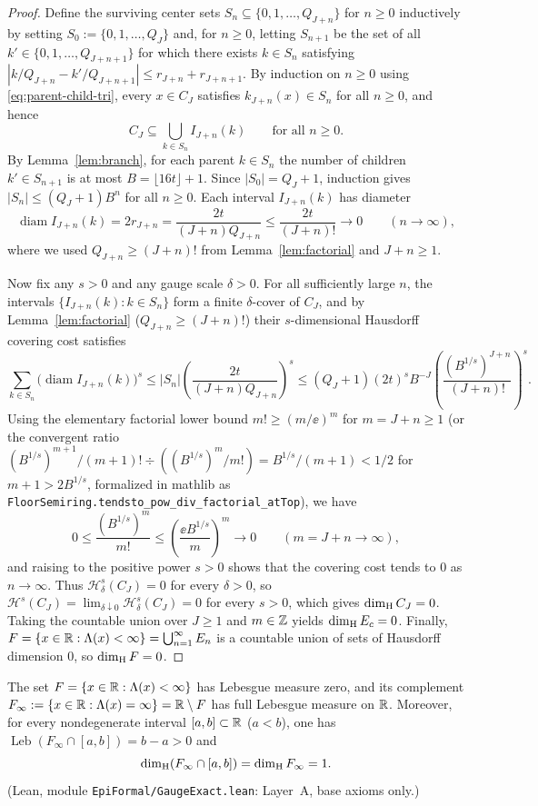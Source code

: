 \begin{proof}
Define the surviving center sets $S_n\subseteq\{0,1,\dots,Q_{J+n}\}$ for
$n\ge0$ inductively by setting $S_0:=\{0,1,\dots,Q_J\}$ and, for $n\ge0$,
letting $S_{n+1}$ be the set of all $k'\in\{0,1,\dots,Q_{J+n+1}\}$ for which
there exists $k\in S_n$ satisfying
$|k/Q_{J+n}-k'/Q_{J+n+1}|\le r_{J+n}+r_{J+n+1}$. By induction on $n\ge0$ using
\eqref{eq:parent-child-tri}, every $x\in C_J$ satisfies $k_{J+n}(x)\in S_n$ for
all $n\ge0$, and hence
\[
C_J\subseteq\bigcup_{k\in S_n} I_{J+n}(k)\qquad\text{for all }n\ge0.
\]
By Lemma~\ref{lem:branch}, for each parent $k\in S_n$ the number of children
$k'\in S_{n+1}$ is at most $B=\lfloor16t\rfloor+1$. Since $|S_0|=Q_J+1$,
induction gives $|S_n|\le(Q_J+1)B^n$ for all $n\ge0$. Each interval
$I_{J+n}(k)$ has diameter
\[
\operatorname{diam}I_{J+n}(k)=2r_{J+n}=\frac{2t}{(J+n)Q_{J+n}}
\le\frac{2t}{(J+n)!}\longrightarrow0\qquad(n\to\infty),
\]
where we used $Q_{J+n}\ge(J+n)!$ from Lemma~\ref{lem:factorial} and $J+n\ge1$.

Now fix any $s>0$ and any gauge scale $\delta>0$. For all sufficiently large
$n$, the intervals $\{I_{J+n}(k):k\in S_n\}$ form a finite $\delta$-cover of
$C_J$, and by Lemma~\ref{lem:factorial} ($Q_{J+n}\ge(J+n)!$) their $s$-dimensional
Hausdorff covering cost satisfies
\[
\sum_{k\in S_n}\bigl(\operatorname{diam}I_{J+n}(k)\bigr)^s
\le |S_n|\left(\frac{2t}{(J+n)Q_{J+n}}\right)^s
\le(Q_J+1)(2t)^s B^{-J}\left(\frac{(B^{1/s})^{J+n}}{(J+n)!}\right)^s.
\]
Using the elementary factorial lower bound $m!\ge(m/\ee)^m$ for $m=J+n\ge1$
(or the convergent ratio $(B^{1/s})^{m+1}/(m+1)!\div((B^{1/s})^m/m!)=B^{1/s}/(m+1)<1/2$
for $m+1>2B^{1/s}$, formalized in mathlib as
\texttt{FloorSemiring.tendsto\_pow\_div\_factorial\_atTop}), we have
\[
0\le\frac{(B^{1/s})^m}{m!}\le\left(\frac{\ee B^{1/s}}{m}\right)^m\longrightarrow0
\qquad(m=J+n\to\infty),
\]
and raising to the positive power $s>0$ shows that the covering cost tends to
$0$ as $n\to\infty$. Thus $\mathcal H_\delta^s(C_J)=0$ for every $\delta>0$,
so $\mathcal H^s(C_J)=\lim_{\delta\downarrow0}\mathcal H_\delta^s(C_J)=0$ for
every $s>0$, which gives $\dim_{\mathrm{H}} C_J=0$. Taking the countable union over
$J\ge1$ and $m\in\mathbb{Z}$ yields $\dim_{\mathrm{H}} E_c=0$. Finally,
$F=\{x\in\mathbb{R}:\Lambda(x)<\infty\}=\bigcup_{n=1}^\infty E_n$ is a countable union of
sets of Hausdorff dimension $0$, so $\dim_{\mathrm{H}} F=0$.
\end{proof}

\begin{corollary}\label{cor:infinite-level}
The set $F=\{x\in\mathbb{R}:\Lambda(x)<\infty\}$ has Lebesgue measure zero, and its
complement $F_\infty:=\{x\in\mathbb{R}:\Lambda(x)=\infty\}=\mathbb{R}\setminus F$ has full
Lebesgue measure on $\mathbb{R}$. Moreover, for every nondegenerate interval
$[a,b]\subset\mathbb{R}$ ($a<b$), one has
$\operatorname{Leb}(F_\infty\cap[a,b])=b-a>0$ and
\[
\dim_{\mathrm{H}}(F_\infty\cap[a,b])=\dim_{\mathrm{H}} F_\infty=1.
\]
(Lean, module \texttt{EpiFormal/\allowbreak GaugeExact.lean}: Layer~A, base axioms only.)
\end{corollary}

